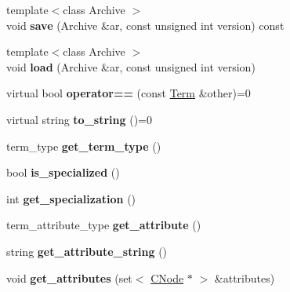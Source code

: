 \begin{DoxyCompactItemize}
\item 
\hypertarget{classTerm_a8ca0a73d0ef9e81f49ad5ec42b816e35}{{\footnotesize template$<$class Archive $>$ }\\void {\bfseries save} (\-Archive \&ar, const unsigned int version) const }\label{classTerm_a8ca0a73d0ef9e81f49ad5ec42b816e35}

\item 
\hypertarget{classTerm_ad922f207c28db09244f8d45bcb1189c6}{{\footnotesize template$<$class Archive $>$ }\\void {\bfseries load} (\-Archive \&ar, const unsigned int version)}\label{classTerm_ad922f207c28db09244f8d45bcb1189c6}

\item 
\hypertarget{classTerm_ad90e662483f23dc370bda049024cab90}{virtual bool {\bfseries operator==} (const \hyperlink{classTerm}{\-Term} \&other)=0}\label{classTerm_ad90e662483f23dc370bda049024cab90}

\item 
\hypertarget{classTerm_a08b3fd1f3988bccfe4a0675950adc86d}{virtual string {\bfseries to\-\_\-string} ()=0}\label{classTerm_a08b3fd1f3988bccfe4a0675950adc86d}

\item 
\hypertarget{classTerm_aeecf09df025c1f11f9f2457601b7d2a3}{term\-\_\-type {\bfseries get\-\_\-term\-\_\-type} ()}\label{classTerm_aeecf09df025c1f11f9f2457601b7d2a3}

\item 
\hypertarget{classTerm_a7da6da9de3176adac3df498fb73500fe}{bool {\bfseries is\-\_\-specialized} ()}\label{classTerm_a7da6da9de3176adac3df498fb73500fe}

\item 
\hypertarget{classTerm_a43d1547013fedd578452e513c2798f64}{int {\bfseries get\-\_\-specialization} ()}\label{classTerm_a43d1547013fedd578452e513c2798f64}

\item 
\hypertarget{classTerm_ac28d94a18f1369f6c9367660fc99552c}{term\-\_\-attribute\-\_\-type {\bfseries get\-\_\-attribute} ()}\label{classTerm_ac28d94a18f1369f6c9367660fc99552c}

\item 
\hypertarget{classTerm_a743de302324fd2eca4d4dad0b03447ee}{string {\bfseries get\-\_\-attribute\-\_\-string} ()}\label{classTerm_a743de302324fd2eca4d4dad0b03447ee}

\item 
\hypertarget{classTerm_a44fb8f8aba38e8363c98be7c46a9827d}{void {\bfseries get\-\_\-attributes} (set$<$ \hyperlink{classCNode}{\-C\-Node} $\ast$ $>$ \&attributes)}\label{classTerm_a44fb8f8aba38e8363c98be7c46a9827d}


\end{DoxyCompactItemize}
